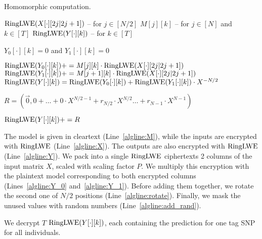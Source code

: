 \documentclass[a4paper]{article}
\newcommand{\RingLWE}{\sc{\mathrm{RingLWE}}}
\begin{document}
\begin{algorithm}
\caption{Homomorphic computation.}
\begin{algorithmic}[1]
    \Require $\RingLWE(X[\cdot][2j|2j+1])$ -- for $j \in [N/2]$ \label{algline:X}
    \Require $M[j][k]$ -- for $j\in [N]$ and $k\in [T]$ \label{algline:M}
    \Ensure $\RingLWE(Y[\cdot][k])$ -- for $k\in [T]$ \label{algline:Y}
    
    \Statex
    
    \State $Y_0[\cdot][k] = 0$ and $Y_1[\cdot][k] = 0$ \label{algline:init}
    
     \label{algline:for_k} 
    	 \label{algline:for_j} 
    			\State $\RingLWE(Y_0[\cdot][k]) += M[j][k] \cdot \RingLWE(X[\cdot][2j|2j+1])$ \label{algline:Y_0}
    		\EndIf
    			\State $\RingLWE(Y_1[\cdot][k]) += M[j+1][k] \cdot \RingLWE(X[\cdot][2j|2j+1])$ \label{algline:Y_1}
    		\EndIf
    	\EndFor
    	\State $\RingLWE(Y[\cdot][k]) = \RingLWE(Y_0[\cdot][k]) + \RingLWE(Y_1[\cdot][k]) \cdot X^{-N/2}$ \label{algline:rotate}
    \EndFor
    
    \State $R = (\vec{0}, 0 + \ldots + 0 \cdot X^{N/2-1} + r_{N/2} \cdot X^{N/2} \ldots + r_{N-1} \cdot X^{N-1})$ 
    
    \State $\RingLWE(Y[\cdot][k]) += R$ \label{algline:add_rand}
    
\end{algorithmic}\label{alg:computation}
\end{algorithm}



The model is given in cleartext (Line~\ref{algline:M}), while the inputs are encrypted with $\RingLWE$  (Line~\ref{algline:X}). 
The outputs are also encrypted with $\RingLWE$ (Line~\ref{algline:Y}).
We pack into a single $\RingLWE$ ciphertexts 2 columns of the input matrix $X$, scaled with scaling factor $P$.
We multiply this encryption with the plaintext model corresponding to both encrypted columns (Lines~\ref{algline:Y_0} and~\ref{algline:Y_1}). 
Before adding them together, we rotate the second one of $N/2$ positions (Line~\ref{algline:rotate}).
Finally, we mask the unused values with random numbers (Line~\ref{algline:add_rand}). 

We decrypt $T$ $\RingLWE(Y[\cdot][k])$, each containing the prediction for one tag SNP for all individuals.
\end{document}
